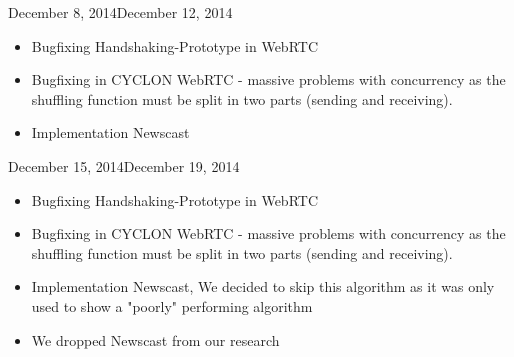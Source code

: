 \documentclass[11pt, english, screen]{report-rd-info}
\begin{document}
\begin{fichesuivi}{December 8, 2014}{December 12, 2014}

   \begin{travaileffectue}
\begin{itemize}
\item {Bugfixing Handshaking-Prototype in WebRTC}
   \item {Bugfixing in CYCLON WebRTC - massive problems with concurrency as the shuffling function must be split in two parts (sending and receiving).}
      \end{itemize}
   \end{travaileffectue}

   \begin{travailnoneffectue}
   \begin{itemize}
   \item {Implementation Newscast}
      \end{itemize}
   \end{travailnoneffectue}

   \begin{echange}
   \end{echange}

   \begin{planification}
   \end{planification}
\end{fichesuivi}

\begin{fichesuivi}{December 15, 2014}{December 19, 2014}

   \begin{travaileffectue}
   \begin{itemize}
   \item {Bugfixing Handshaking-Prototype in WebRTC}
   \item {Bugfixing in CYCLON WebRTC - massive problems with concurrency as the shuffling function must be split in two parts (sending and receiving).}
      \end{itemize}
   \end{travaileffectue}

   \begin{travailnoneffectue}
   \begin{itemize}
   \item {Implementation Newscast, We decided to skip this algorithm as it was only used to show a "poorly" performing algorithm}
      \end{itemize}
   \end{travailnoneffectue}

   \begin{echange}
   \begin{itemize}
   \item {We dropped Newscast from our research}
      \end{itemize}
   \end{echange}

   \begin{planification}
   \end{planification}
\end{fichesuivi}
\end{document}

